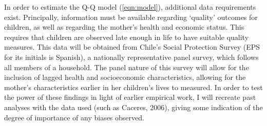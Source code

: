 \documentclass{article}[11pt,subeqn]
\begin{document}
\begin{spacing}{1.25}
In order to estimate the Q-Q model (\ref{eqn:model}), additional data requirements exist.  Principally,
information must be available regarding `quality' outcomes for children, as well as regarding the mother's
health and economic status.  This requires that children are observed late enough in life to have suitable
quality measures.  This data will be obtained from Chile's Social Protection Survey (EPS for its initials
is Spanish), a nationally representative panel survey, which follows all members of a household.  The panel
nature of this survey will allow for the inclusion of lagged health and socioeconomic characteristics,
allowing for the mother's characteristics earlier in her children's lives to measured.  In order to test
the power of these findings in light of earlier empirical work, I will recreate past analyses with the
data used (such as Caceres, 2006), giving some indication of the degree of importance of any biases observed.


\end{spacing}
\end{document}
